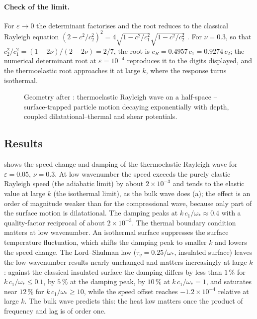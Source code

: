 \paragraph{Check of the limit.} For $\varepsilon\to0$ the determinant factorises and the root reduces to the classical Rayleigh equation $(2-c^2/c_2^2)^2=4\sqrt{1-c^2/c_1^2}\sqrt{1-c^2/c_2^2}$ \citep{Rayleigh1885}. For $\nu=0.3$, so that $c_2^2/c_1^2=(1-2\nu)/(2-2\nu)=2/7$, the root is $c_R=0.4957\,c_1=0.9274\,c_2$; the numerical determinant root at $\varepsilon=10^{-4}$ reproduces it to the digits displayed, and the thermoelastic root approaches it at large $k$, where the response turns isothermal.
\begin{figure}[t!]\centering\small

\caption{Geometry after \citep{Rayleigh1885}: thermoelastic Rayleigh wave on a half-space -- surface-trapped particle motion decaying exponentially with depth, coupled dilatational--thermal and shear potentials.}\label{fig:rayleigh-geo}
\end{figure}

\subsection{Results}
 shows the speed change and damping of the thermoelastic Rayleigh wave for $\varepsilon=0.05$, $\nu=0.3$. At low wavenumber the speed exceeds the purely elastic Rayleigh speed (the adiabatic limit) by about $2\times10^{-3}$ and tends to the elastic value at large $k$ (the isothermal limit), as the bulk wave does (a); the effect is an order of magnitude weaker than for the compressional wave, because only part of the surface motion is dilatational. The damping peaks at $k\,c_1/\omega_*\approx0.4$ with a quality-factor reciprocal of about $2\times10^{-3}$. The thermal boundary condition matters at low wavenumber. An isothermal surface suppresses the surface temperature fluctuation, which shifts the damping peak to smaller $k$ and lowers the speed change. The Lord--Shulman law ($\tau_q=0.25/\omega_*$, insulated surface) leaves the low-wavenumber results nearly unchanged and matters increasingly at large $k$: against the classical insulated surface the damping differs by less than $1\,\%$ for $k\,c_1/\omega_*\le0.1$, by $5\,\%$ at the damping peak, by $10\,\%$ at $k\,c_1/\omega_*=1$, and saturates near $12\,\%$ for $k\,c_1/\omega_*\ge10$, while the speed offset reaches $-1.2\times10^{-4}$ relative at large $k$. The bulk wave predicts this: the heat law matters once the product of frequency and lag is of order one.

